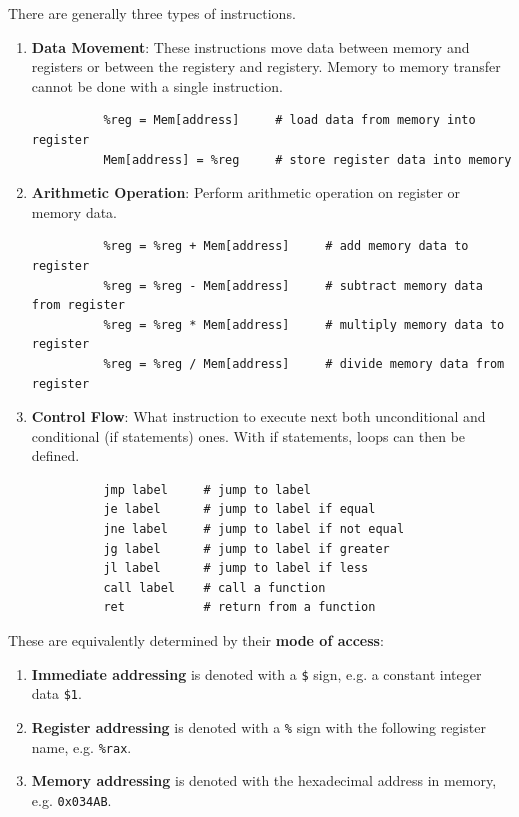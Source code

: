   \begin{definition}
    There are generally three types of instructions. 
    \begin{enumerate} 
      \item \textbf{Data Movement}: These instructions move data between memory and registers or between the registery and registery. Memory to memory transfer cannot be done with a single instruction. 
        \begin{lstlisting} 
          %reg = Mem[address]     # load data from memory into register
          Mem[address] = %reg     # store register data into memory
        \end{lstlisting}
      \item \textbf{Arithmetic Operation}: Perform arithmetic operation on register or memory data. 
        \begin{lstlisting} 
          %reg = %reg + Mem[address]     # add memory data to register
          %reg = %reg - Mem[address]     # subtract memory data from register
          %reg = %reg * Mem[address]     # multiply memory data to register
          %reg = %reg / Mem[address]     # divide memory data from register
        \end{lstlisting}
      \item \textbf{Control Flow}: What instruction to execute next both unconditional and conditional (if statements) ones. With if statements, loops can then be defined. 
        \begin{lstlisting} 
          jmp label     # jump to label
          je label      # jump to label if equal
          jne label     # jump to label if not equal
          jg label      # jump to label if greater
          jl label      # jump to label if less
          call label    # call a function
          ret           # return from a function
        \end{lstlisting}
    \end{enumerate}
  \end{definition}

  \begin{definition}

    These are equivalently determined by their \textbf{mode of access}:
    \begin{enumerate} 
      \item \textbf{Immediate addressing} is denoted with a \texttt{\$} sign, e.g. a constant integer data \texttt{\$1}. 
      \item \textbf{Register addressing} is denoted with a \texttt{\%} sign with the following register name, e.g. \texttt{\%rax}.
      \item \textbf{Memory addressing} is denoted with the hexadecimal address in memory, e.g. \texttt{0x034AB}.
    \end{enumerate}
  \end{definition}


